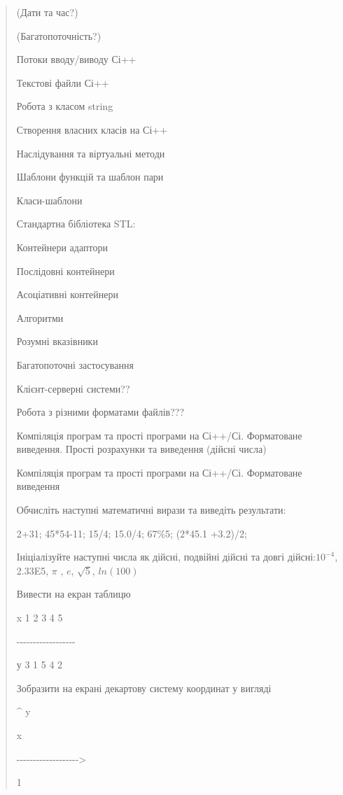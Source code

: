 \documentclass[]{article}
\begin{document}
\begin{quote}
(Дати та час?)

(Багатопоточність?)

Потоки вводу/виводу Сі++

Текстові файли Сі++

Робота з класом string

Створення власних класів на Сі++

Наслідування та віртуальні методи

Шаблони функцій та шаблон пари

Класи-шаблони

Стандартна бібліотека STL:

Контейнери адаптори

Послідовні контейнери

Асоціативні контейнери

Алгоритми

Розумні вказівники

Багатопоточні застосування

Клієнт-серверні системи??

Робота з різними форматами файлів???

Компіляція програм та прості програми на Сі++/Сі. Форматоване виведення.
Прості розрахунки та виведення (дійсні числа)

Компіляція програм та прості програми на Сі++/Сі. Форматоване виведення

Обчисліть наступні математичні вирази та виведіть результати:

2+31; 45*54-11; 15/4; 15.0/4; 67\%5; (2*45.1 +3.2)/2;

Ініціалізуйте наступні числа як дійсні, подвійні дійсні та довгі
дійсні:\(10^{- 4}\), 2.33E5, \(\pi\) , \(e\), \(\sqrt{5}\), \(ln(100)\)

Вивести на екран таблицю

x \textbar{} 1 \textbar{} 2 \textbar{} 3 \textbar{} 4 \textbar{} 5

-\/-\/-\/-\/-\/-\/-\/-\/-\/-\/-\/-\/-\/-\/-\/-\/-\/-

у \textbar{} 3 \textbar{} 1 \textbar{} 5 \textbar{} 4 \textbar{} 2

Зобразити на екрані декартову систему координат у вигляді

\^{} y

\textbar{} x

-\/-\/-\/-\/-\/-\/-\/-\/-\/-\/-\/-\/-\/-\/-\/-\/-\/-\/-\textgreater{}

\textbar{} 1

\textbar{}


\end{quote}
\end{document}
